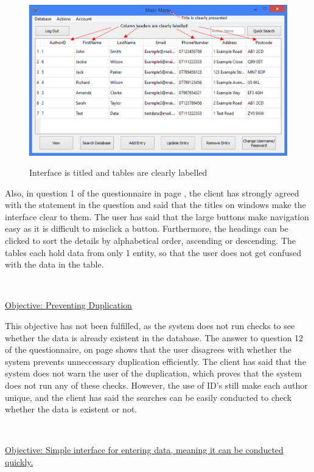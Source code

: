 \begin{figure}[H]
    \includegraphics[width=\textwidth]{./Evaluation/Evidence/Clarity.png}
    \label{fig:InterfaceClarity} \caption{Interface is titled and tables are clearly labelled}
\end{figure}

Also, in question 1 of the questionnaire in page \pageref{fig:QuestionnairePage1}, the client has strongly agreed with the statement in the question and said that the titles on windows make the interface clear to them. The user has said that the large buttons make navigation easy as it is difficult to misclick a button. Furthermore, the headings can be clicked to sort the details by alphabetical order, ascending or descending. The tables each hold data from only 1 entity, so that the user does not get confused with the data in the table.

\

\underline{Objective: Preventing Duplication}

This objective has not been fulfilled, as the system does not run checks to see whether the data is already existent in the database. The answer to question 12 of the questionnaire, on page \pageref{fig:QuestionnairePage2} shows that the user disagrees with whether the system prevents unneccessary duplication efficiently. The client has said that the system does not warn the user of the duplication, which proves that the system does not run any of these checks. However, the use of ID's still make each author unique, and the client has said the searches can be easily conducted to check whether the data is existent or not. 

\

\underline{Objective: Simple interface for entering data, meaning it can be conducted quickly.}

